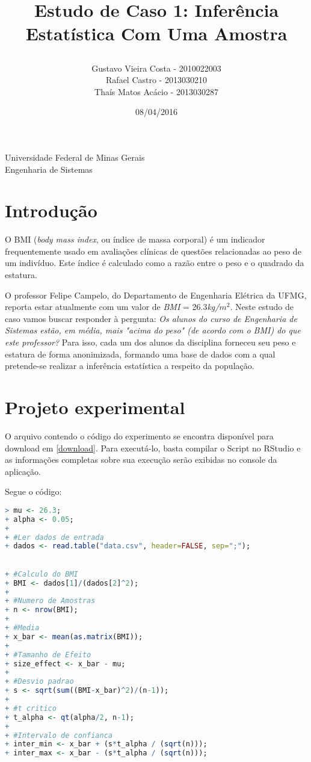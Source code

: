 \documentclass[12pt, a4paper]{article}
\title{
	\begin{large}
		Estudo de Caso 1: Inferência Estatística Com Uma Amostra
	\end{large}	}
\author{Gustavo Vieira Costa - 2010022003\\Rafael Castro - 2013030210\\Thaís Matos Acácio - 2013030287}
\date{08/04/2016}
\begin{document}
	\maketitle
	
	\vspace*{-7.5cm}
	{\bf
		\begin{center}
			{\large
				\hspace*{0cm}Universidade Federal de Minas Gerais} \\
			\hspace*{0cm}Engenharia de Sistemas  \\
		\end{center}
	}
	\vspace*{5cm}
	
\section{Introdução}
O BMI (\textit{body mass index}, ou índice de massa corporal) é um indicador frequentemente usado em avaliações clínicas de questões relacionadas ao peso de um indivíduo. Este índice é calculado como a razão entre o peso e o quadrado da estatura.
\par O professor Felipe Campelo, do Departamento de Engenharia Elétrica da UFMG, reporta estar atualmente com um valor de \textit{BMI} = 26.3\textit{kg/$m^{2}$}. Neste estudo de caso vamos buscar responder à pergunta: \textit{Os alunos do curso de Engenharia de Sistemas estão, em média, mais "acima do peso" (de acordo com o BMI) do que este professor?} Para isso, cada um dos alunos da disciplina forneceu seu peso e estatura de forma anonimizada, formando uma base de dados com a qual pretende-se realizar a inferência estatística a respeito da população.
	
\section{Projeto experimental}
O arquivo contendo o código do experimento se encontra disponível para download em \ref{download}. Para executá-lo, basta compilar o Script no RStudio e as informações completas sobre sua execução serão exibidas no console da aplicação.

Segue o código:

\begin{lstlisting}[language=R]
> mu <- 26.3;
+ alpha <- 0.05;
+	
+ #Ler dados de entrada
+ dados <- read.table("data.csv", header=FALSE, sep=";");
	

+ #Calculo do BMI
+ BMI <- dados[1]/(dados[2]^2);
+	
+ #Numero de Amostras
+ n <- nrow(BMI);
+	
+ #Media
+ x_bar <- mean(as.matrix(BMI));
+	
+ #Tamanho de Efeito
+ size_effect <- x_bar - mu;
+	
+ #Desvio padrao
+ s <- sqrt(sum((BMI-x_bar)^2)/(n-1));
+	
+ #t critico
+ t_alpha <- qt(alpha/2, n-1);
+	
+ #Intervalo de confianca
+ inter_min <- x_bar + (s*t_alpha / (sqrt(n)));
+ inter_max <- x_bar - (s*t_alpha / (sqrt(n)));	
\end{lstlisting}
	
\end{document}
